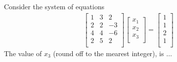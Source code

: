 
\iffalse
	\chapter{2020}
	\author{AI24BTECH11001}
	\section{ce}
\fi	
    \item Consider the system of equations
    \begin{align*}
    \begin{bmatrix}
        1 & 3 & 2 \\
        2 & 2 & -3 \\
        4 & 4 & -6 \\
        2 & 5 & 2 \\
    \end{bmatrix}
    \begin{bmatrix}
        x_1 \\
        x_2 \\
        x_3 \\
    \end{bmatrix}
    =
    \begin{bmatrix}
        1 \\
        1 \\
        2 \\
        1 \\
    \end{bmatrix}
    \end{align*}
    The value of $x_3$ (round off to the mearest integer), is $\dots$

